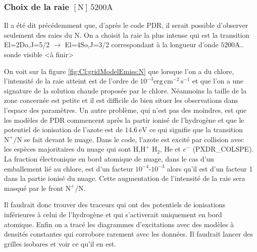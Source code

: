 \subsubsection{Choix de la raie $[\mathrm{N}]\,5200 \mathrm{A}$}

Il a été dit précédemment que, d'après le code PDR, il serait possible d'observer seulement des raies du $\mathrm{N}$. On a choisit la raie la plus intense qui est la transition El=2Do,J=5/2 $\rightarrow$ El=4So,J=3/2 correspondant à la longueur d'onde $5200 \mathrm{A}$.. sonde visible <à finir>

On voit sur la figure \ref{fig:Cl:gridModelEmiss:N} que lorsque l'on a du chlore, l'intensité de la raie atteint est de l'ordre de $10^{-3} \mathrm{erg}\,\mathrm{cm}^{-2}\,\mathrm{s}^{-1}$ et que l'on a une signature de la solution chaude proposée par le chlore. Néanmoins la taille de la zone concernée est petite et il est difficile de bien situer les observations dans l'espace des paramètres. Un autre problème, qui n'est pas des moindres, est que les modèles de PDR commencent après la partir ionisé de l'hydrogène et que le potentiel de ionisation de l'azote est de $14.6 \ \mathrm{eV}$ ce qui signifie que la transition $\mathrm{N}^+/\mathrm{N}$ se fait devant le nuage. Dans le code, l'azote est excité par collision avec les espèces majoritaires du nuage qui sont $\mathrm{H}$,$\mathrm{H}^+$ $\mathrm{H}_2$, $\mathrm{He}$ et $e^-$ (PXDR\_COLSPE). La fraction électronique en bord atomique de nuage, dans le cas d'un emballement lié au chlore, est d'un facteur $10^{-4}$-$10^{-3}$ alors qu'il est d'un facteur 1 dans la partie ionisé du nuage. Cette augmentation de l'intensité de la raie sera masqué par le front $\mathrm{N}^+/\mathrm{N}$. \newline

Il faudrait donc trouver des traceurs qui ont des potentiels de ionisations inférieures à celui de l'hydrogène et qui s'activerait uniquement en bord atomique. Enfin on a tracé les diagrammes d'excitations avec des modèles à densités constantes qui corrobore rarement avec les données. Il faudrait lancer des grilles isobares et voir ce qu'il en est.



